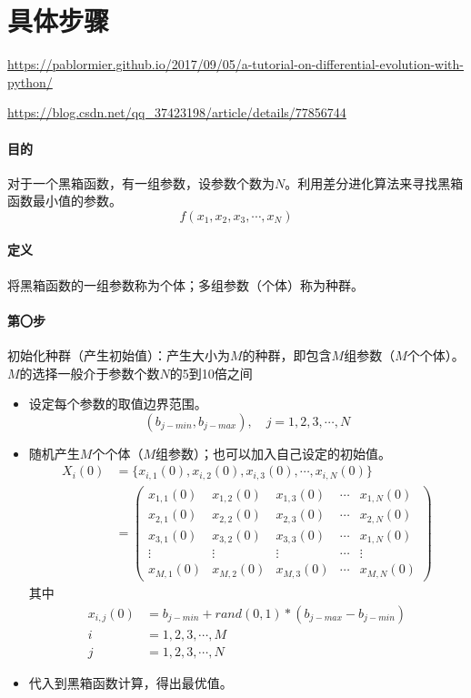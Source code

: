 \section{具体步骤}
{\small\url{https://pablormier.github.io/2017/09/05/a-tutorial-on-differential-evolution-with-python/}}

\url{https://blog.csdn.net/qq_37423198/article/details/77856744}

\paragraph{目的} 对于一个黑箱函数，有一组参数，设参数个数为$N$。利用差分进化算法来寻找黑箱函数最小值的参数。
\begin{equation}
f(x_1,x_2,x_3,\cdots,x_N)
\end{equation}

\paragraph{定义} 将黑箱函数的一组参数称为个体；多组参数（个体）称为种群。
 
\paragraph{第〇步} 初始化种群（产生初始值）：产生大小为$M$的种群，即包含$M$组参数（$M$个个体）。$M$的选择一般介于参数个数$N$的5到10倍之间

\begin{itemize}
\item 设定每个参数的取值边界范围。
\begin{equation}
(b_{j-min},b_{j-max}),\quad j = 1, 2, 3, \cdots, N
\end{equation}
\item 随机产生$M$个个体（$M$组参数）；也可以加入自己设定的初始值。
\begin{align}
X_i(0) &= \{x_{i,1}(0),x_{i,2}(0),x_{i,3}(0),\cdots, x_{i,N}(0)\}\\
&=\begin{pmatrix}
x_{1,1}(0) & x_{1,2}(0) &x_{1,3}(0) &\cdots &x_{1,N}(0)\\
x_{2,1}(0) & x_{2,2}(0) &x_{2,3}(0) &\cdots &x_{2,N}(0)\\
x_{3,1}(0) & x_{3,2}(0) &x_{3,3}(0) &\cdots &x_{1,N}(0)\\
\vdots      &   \vdots     & \vdots      & \cdots & \vdots \\
x_{M,1}(0) & x_{M,2}(0) &x_{M,3}(0) &\cdots &x_{M,N}(0)
\end{pmatrix}
\end{align}
其中
\begin{align}
x_{i,j}(0) &= b_{j-min} + rand(0,1)* (b_{j-max}-b_{j-min})\\
 i &= 1,2,3,\cdots, M\\
 j &= 1,2,3,\cdots, N
\end{align}
\item 代入到黑箱函数计算，得出最优值。
\end{itemize}


